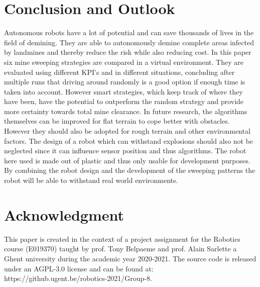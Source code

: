 \documentclass[conference]{IEEEtran}
\begin{document}
\section{Conclusion and Outlook \label{sec:Conclusion}}
Autonomous robots have a lot of potential and can save thousands of lives in the field of demining. They are able to autonomously demine complete areas infected by landmines and thereby reduce the risk while also reducing cost. In this paper six mine sweeping strategies are compared in a virtual environment. They are evaluated using different KPI's and in different situations, concluding after multiple runs that driving around randomly is a good option if enough time is taken into account. However smart strategies, which keep track of where they have been, have the potential to outperform the random strategy and provide more certainty towards total mine clearance. In future research, the algorithms themselves can be improved for flat terrain to cope better with obstacles. However they should also be adopted for rough terrain and other environmental factors. The design of a robot which can withstand explosions should also not be neglected since it can influence sensor position and thus algorithms. The robot here used is made out of plastic and thus only usable for development purposes. By combining the robot design and the development of the sweeping patterns the robot will be able to withstand real world environments. 

\section*{Acknowledgment}

This paper is created in the context of a project assignment for the Robotics course (E019370) taught by prof. Tony Belpaeme and prof. Alain Sarlette a Ghent university during the academic year 2020-2021. The source code is released under an AGPL-3.0 license and can be found at: https://github.ugent.be/robotics-2021/Group-8.


\printbibliography
\vspace{12pt}
\end{document}

